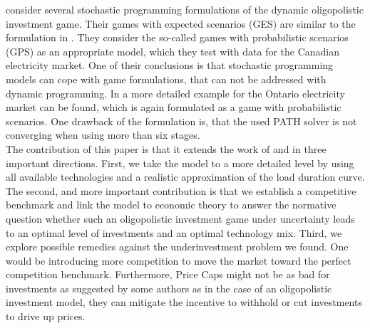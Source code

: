 \cite{Genc2007} consider several stochastic programming formulations of the dynamic oligopolistic investment game. Their games with expected scenarios (GES) are similar to the formulation in \cite{Pineau2003}. They consider the so-called games with probabilistic scenarios (GPS) as an appropriate model, which they test with data for the Canadian electricity market. One of their conclusions is that stochastic programming models can cope with game formulations, that can not be addressed with dynamic programming. In \cite{Genc2008} a more detailed example for the Ontario electricity market can be found, which is again formulated as a game with probabilistic scenarios. One drawback of the formulation is, that the used PATH solver is not converging when using more than six stages. \\
The contribution of this paper is that it extends the work of \cite{Genc2007} and  \cite{Genc2008} in three important directions. First, we take the model to a more detailed level by using all available technologies and a realistic approximation of the load duration curve. The second, and more important contribution is that we establish a competitive benchmark and link the model to economic theory to answer the normative question whether such an oligopolistic investment game under uncertainty leads to an optimal level of investments and an optimal technology mix. Third, we explore possible remedies against the underinvestment problem we found. One would be introducing more competition to move the market toward the perfect competition benchmark. Furthermore, Price Caps might not be as bad for investments as suggested by some authors as in the case of an oligopolistic investment model, they can mitigate the incentive to withhold or cut investments to drive up prices.







